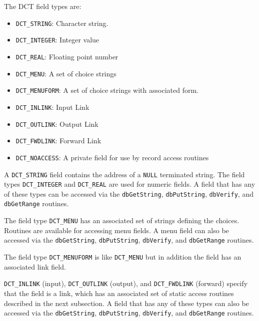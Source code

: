 The DCT field types are:

\begin{itemize}
\item {}\verb|DCT_STRING|: Character string.

\item {}\verb|DCT_INTEGER|: Integer value

\item {}\verb|DCT_REAL|: Floating point number

\item {}\verb|DCT_MENU|: A set of choice strings

\item {}\verb|DCT_MENUFORM|: A set of choice strings with associated form.

\item {}\verb|DCT_INLINK|: Input Link

\item {}\verb|DCT_OUTLINK|: Output Link

\item {}\verb|DCT_FWDLINK|: Forward Link

\item {}\verb|DCT_NOACCESS|: A private field for use by record access routines

\end{itemize}

A \verb|DCT_STRING| field contains the address of a \verb|NULL| terminated string.
The field types \verb|DCT_INTEGER| and \verb|DCT_REAL| are used for numeric fields.
A field that has any of these types can be accessed via the \verb|dbGetString|, \verb|dbPutString|, \verb|dbVerify|, and \verb|dbGetRange| routines.

The field type \verb|DCT_MENU| has an associated set of strings defining the choices.
Routines are available for accessing menu fields.
A menu field can also be accessed via the \verb|dbGetString|, \verb|dbPutString|, \verb|dbVerify|, and \verb|dbGetRange| 
routines.

The field type \verb|DCT_MENUFORM| is like \verb|DCT_MENU| but in addition the field has an associated link field.

\verb|DCT_INLINK| (input), \verb|DCT_OUTLINK| (output), and \verb|DCT_FWDLINK| (forward) specify that the field is a link, which has an associated set of static access routines described in the next subsection.
A field that has any of these types can also be accessed via the \verb|dbGetString|, \verb|dbPutString|, \verb|dbVerify|, and \verb|dbGetRange| routines.


